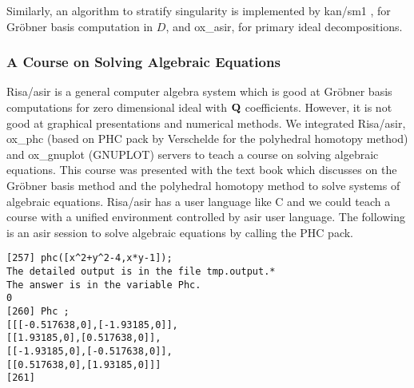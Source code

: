Similarly, 
an algorithm to stratify singularity 
\cite{oaku-advance}
is implemented by
kan/sm1 \cite{kan}, for Gr\"obner basis computation in $D$, and
ox\_asir, for primary ideal decompositions.

\subsubsection{A Course on Solving Algebraic Equations}

Risa/asir \cite{asir} is a general computer algebra system
which is good at Gr\"obner basis computations for zero dimensional ideal
with ${\bf Q}$ coefficients.
However, it is not good at graphical presentations and
numerical methods.
We integrated Risa/asir, ox\_phc (based on PHC pack by Verschelde \cite{phc}
for the polyhedral homotopy method) and
ox\_gnuplot (GNUPLOT) servers
to teach a course on solving algebraic equations.
This course was presented with the text book \cite{CLO} which discusses
on the Gr\"obner basis method and the polyhedral homotopy method
to solve systems of algebraic equations.
Risa/asir has a user language like C and we could teach a course
with a unified environment
controlled by asir user language.
The following is an asir session to solve algebraic equations by calling
the PHC pack.
\begin{verbatim}
[257] phc([x^2+y^2-4,x*y-1]);
The detailed output is in the file tmp.output.*
The answer is in the variable Phc.
0
[260] Phc ;
[[[-0.517638,0],[-1.93185,0]],
[[1.93185,0],[0.517638,0]],
[[-1.93185,0],[-0.517638,0]],
[[0.517638,0],[1.93185,0]]]
[261] 
\end{verbatim}



